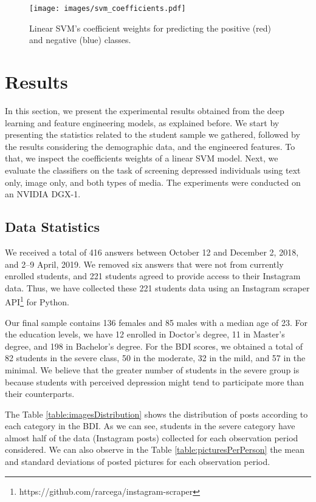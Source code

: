 \documentclass[letterpaper]{article} \usepackage{aaai20}  \usepackage{times}  \usepackage{helvet} \usepackage{courier}  \usepackage[hyphens]{url}  \usepackage{graphicx} \urlstyle{rm} \def\UrlFont{\rm}  \usepackage{graphicx}  \frenchspacing  \setlength{\pdfpagewidth}{8.5in}  \setlength{\pdfpageheight}{11in}  \usepackage[final]{changes}
\begin{document}
\begin{figure*}[h]
\centering
\texttt{[image: images/svm\_coefficients.pdf]}
\caption{Linear SVM's coefficient weights for predicting the positive (red) and negative (blue) classes.}
\label{figure:linearsvm} 
\end{figure*}

\section{Results}\label{sec:results}
In this section, we present the experimental results obtained from the deep learning and feature engineering models, as explained before. We start by presenting the statistics related to the student sample we gathered, followed by the results considering the demographic data, and the engineered features. To that, we inspect the coefficients weights of a linear SVM model. Next, we evaluate the classifiers on the task of screening depressed individuals using text only, image only, and both types of media. The experiments were conducted on an NVIDIA DGX-1.

\subsection{Data Statistics}
We received a total of 416 answers between October 12 and December 2, 2018, and 2--9 April, 2019. We removed six answers that were not from currently enrolled students, and 221 students agreed to provide access to their Instagram data. Thus, we have collected these 221 students data using an Instagram scraper API\footnote{https://github.com/rarcega/instagram-scraper} for Python.

Our final sample contains 136 females and 85 males with a median age of 23. For the education levels, we have 12 enrolled in Doctor's degree, 11 in Master's degree, and 198 in Bachelor's degree. For the BDI scores, we obtained a total of 82 students in the severe class, 50 in the moderate, 32 in the mild, and 57 in the minimal. We believe that the greater number of students in the severe group is because students with perceived depression might tend to participate more than their counterparts.

The Table \ref{table:imagesDistribution} shows the distribution of posts according to each category in the BDI. As we can see, students in the severe category have almost half of the data (Instagram posts) collected for each observation period considered. We can also observe in the Table \ref{table:picturesPerPerson} the mean and standard deviations of posted pictures for each observation period.
\end{document}
